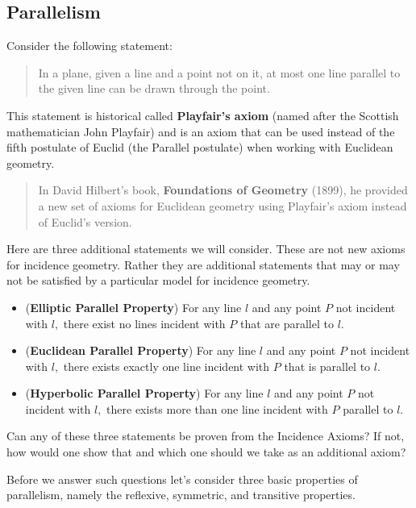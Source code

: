 \documentclass[
  twoside,
  12pt,
  letterpaper,
  fleqn]{article}
\providecommand{\tightlist}{%
  \setlength{\itemsep}{0pt}\setlength{\parskip}{0pt}}\usepackage{longtable,booktabs,array}
\theoremstyle{definition}
\theoremstyle{definition}
\theoremstyle{plain}
\theoremstyle{plain}
\theoremstyle{remark}
\begin{document}
\hypertarget{parallelism}{%
\subsection{Parallelism}\label{parallelism}}

Consider the following statement:

\begin{quote}
In a plane, given a line and a point not on it, at most one line
parallel to the given line can be drawn through the point.
\end{quote}

This statement is historical called \textbf{Playfair's axiom} (named
after the Scottish mathematician John Playfair) and is an axiom that can
be used instead of the fifth postulate of Euclid (the Parallel
postulate) when working with Euclidean geometry.

\begin{quote}
In David Hilbert's book, \textbf{Foundations of Geometry} (1899), he
provided a new set of axioms for Euclidean geometry using Playfair's
axiom instead of Euclid's version.
\end{quote}

Here are three additional statements we will consider. These are not new
axioms for incidence geometry. Rather they are additional statements
that may or may not be satisfied by a particular model for incidence
geometry.

\begin{itemize}
\tightlist
\item
  (\textbf{Elliptic Parallel Property}) For any line \(l\) and any point
  \(P\) not incident with \(l,\) there exist no lines incident with
  \(P\) that are parallel to \(l.\)
\item
  (\textbf{Euclidean Parallel Property}) For any line \(l\) and any
  point \(P\) not incident with \(l,\) there exists exactly one line
  incident with \(P\) that is parallel to \(l.\)
\item
  (\textbf{Hyperbolic Parallel Property}) For any line \(l\) and any
  point \(P\) not incident with \(l,\) there exists more than one line
  incident with \(P\) parallel to \(l.\)
\end{itemize}

Can any of these three statements be proven from the Incidence Axioms?
If not, how would one show that and which one should we take as an
additional axiom?

Before we answer such questions let's consider three basic properties of
parallelism, namely the reflexive, symmetric, and transitive properties.
\end{document}
